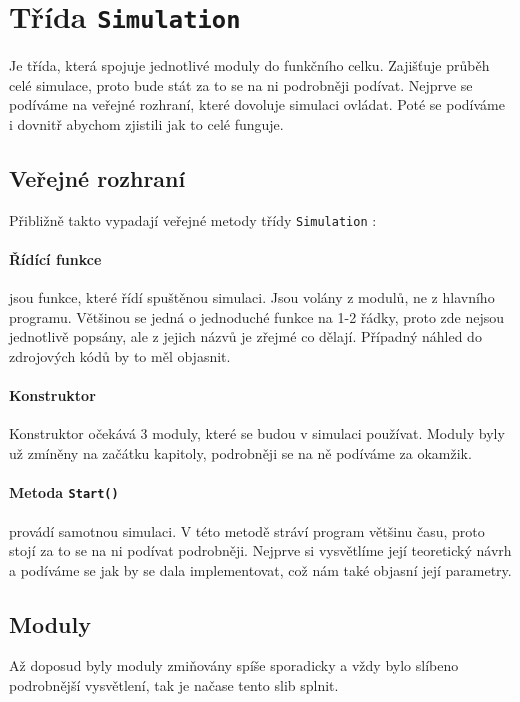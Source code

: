 
\section{Třída \texttt{Simulation}}
Je třída, která spojuje jednotlivé moduly do funkčního celku. Zajišťuje průběh celé simulace, proto bude stát za to se na ni podrobněji podívat. Nejprve se podíváme na veřejné rozhraní, které dovoluje simulaci ovládat. Poté se podíváme i dovnitř abychom zjistili jak to celé funguje.
\subsection{Veřejné rozhraní}
Přibližně takto vypadají veřejné metody třídy \texttt{Simulation} :
\paragraph{Řídící funkce}
jsou funkce, které řídí spuštěnou simulaci. Jsou volány z modulů, ne z hlavního programu. Většinou se jedná o jednoduché funkce na 1-2 řádky, proto zde nejsou jednotlivě popsány, ale z jejich názvů je zřejmé co dělají. Případný náhled do zdrojových kódů by to měl objasnit.
\paragraph{Konstruktor}
Konstruktor očekává 3 moduly, které se budou v simulaci používat. Moduly byly už zmíněny na začátku kapitoly, podrobněji se na ně podíváme za okamžik.
\paragraph{Metoda \texttt{Start()}}
provádí samotnou simulaci. V této metodě stráví program většinu času, proto stojí za to se na ni podívat podrobněji. Nejprve si vysvětlíme její teoretický návrh a podíváme se jak by se dala implementovat, což nám také objasní její parametry.
\subsection{Moduly}
\label{sub:moduly}
Až doposud byly moduly zmiňovány spíše sporadicky a vždy bylo slíbeno podrobnější vysvětlení, tak je načase tento slib splnit.
